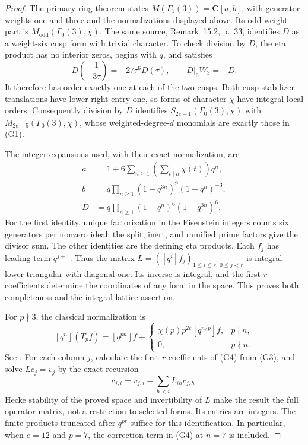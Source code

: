 \begin{proof}
The primary ring theorem
\cite[paragraph on $\Gamma_1(3)$, p.~12]{K17CleryVanDerGeer2022}
states $M(\Gamma_1(3))=\mathbf C[a,b]$, with generator weights one and
three and the normalizations displayed above. Its odd-weight part is
$M_{\mathrm{odd}}(\Gamma_0(3),\chi)$.
The same source, Remark~15.2, p.~33, identifies $D$ as a weight-six cusp
form with trivial character. To check division by $D$, the eta product
has no interior zeros, begins with $q$, and satisfies
\[
 D\!\left(-\frac1{3\tau}\right)=-27\tau^6D(\tau),
 \qquad D|_6W_3=-D.
\]
It therefore has order exactly one at each of the two cusps.
Both cusp stabilizer translations have lower-right entry one, so
forms of character $\chi$ have integral local orders. Consequently
division by $D$ identifies $S_{2e+1}(\Gamma_0(3),\chi)$ with
$M_{2e-5}(\Gamma_0(3),\chi)$, whose weighted-degree-$d$ monomials are
exactly those in (G1).

The integer expansions used, with their exact normalization, are
\[
\begin{aligned}
 a&=1+6\sum_{n\ge1}\left(\sum_{t\mid n}\chi(t)\right)q^n,\\
 b&=q\prod_{n\ge1}(1-q^{3n})^9(1-q^n)^{-3},\\
 D&=q\prod_{n\ge1}(1-q^n)^6(1-q^{3n})^6.
\end{aligned}
 \tag{G3}
\]
For the first identity, unique factorization in the Eisenstein integers
counts six generators per nonzero ideal; the split, inert, and ramified
prime factors give the divisor sum. The other identities are the
defining eta products. Each $f_j$ has leading term $q^{j+1}$.
Thus the matrix
$L=([q^i]f_j)_{1\le i\le r,\,0\le j<r}$ is integral lower triangular
with diagonal one. Its inverse is integral, and the first $r$
coefficients determine the coordinates of any form in the space.
This proves both completeness and the integral-lattice assertion.

For $p\nmid3$, the classical normalization is
\[
 [q^n](T_pf)=[q^{pn}]f+
 \begin{cases}
 \chi(p)p^{2e}[q^{n/p}]f,&p\mid n,\\
 0,&p\nmid n.
 \end{cases}
 \tag{G4}
\]
See \cite[\S8.2.2, p.~66]{K17RibetStein2011}.
For each column $j$, calculate the first $r$ coefficients of (G4)
from (G3), and solve $Lc_j=v_j$ by the exact recursion
\[
 c_{j,i}=v_{j,i}-\sum_{h<i}L_{ih}c_{j,h}.
 \tag{G5}
\]
Hecke stability of the proved space and invertibility of $L$ make the
result the full operator matrix, not a restriction to selected forms.
Its entries are integers. The finite products truncated after
$q^{pr}$ suffice for this identification. In particular, when $e=12$
and $p=7$, the correction term in (G4) at $n=7$ is included.


\end{proof}
